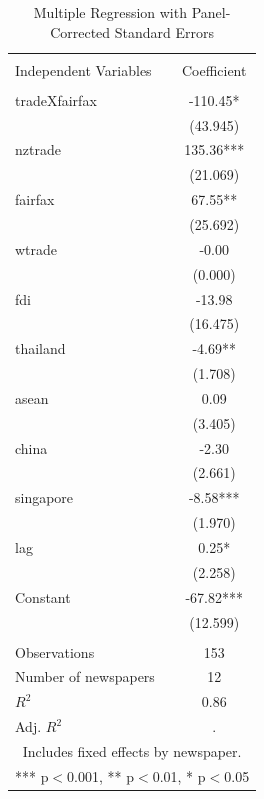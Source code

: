 \documentclass[12pt]{report}
\begin{document}
\begin{center}
\begin{table}
\caption{Multiple Regression with Panel-Corrected Standard Errors}
\vspace{2em}
{\scriptsize
\begin{tabular}{lc} \hline  &  \\ Independent Variables & Coefficient \\
\hline  &  \\ tradeXfairfax & -110.45* \\
 & (43.945) \\ nztrade & 135.36*** \\ 
& (21.069) \\ fairfax & 67.55** \\  &
(25.692) \\ wtrade & -0.00 \\  &
(0.000) \\ fdi & -13.98 \\  &
(16.475) \\ thailand & -4.69** \\  &
(1.708) \\ asean & 0.09 \\  &
(3.405) \\ china & -2.30 \\  &
(2.661) \\ singapore & -8.58*** \\  &
(1.970) \\ lag & 0.25* \\  &
(2.258) \\ Constant & -67.82*** \\  &
(12.599) \\  &
 \\ Observations & 153 \\ Number of newspapers & 12 \\ $R^2$ &
0.86 \\  Adj. $R^2$ & . \\ \hline \multicolumn{2}{c}{ Includes fixed effects by
newspaper. } \\ \multicolumn{2}{c}{ *** p$<$0.001, **
p$<$0.01, * p$<$0.05} \\
\end{tabular}
}
\label{default}
\end{table}
\end{center}
\end{document}

